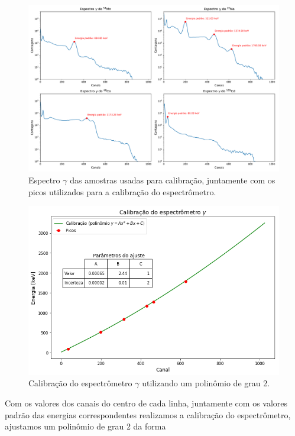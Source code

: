 \documentclass[a4paper, 11pt, notitlepage]{article}
\numberwithin{equation}{section}  %
\begin{document}
\begin{figure}[h]
    \centering
    \includegraphics[width=1.00\textwidth]{espectros_amostras_calibracao.pdf}
    \caption{Espectro $\gamma$ das amostras usadas para calibração, juntamente com os picos utilizados para a calibração do espectrômetro.}
    \label{fig:espectro.calibracao}
\end{figure}

\begin{figure}[H]
    \centering
    \includegraphics[width=1.00\textwidth]{ajuste_calibracao.png}
    \caption{Calibração do espectrômetro $\gamma$ utilizando um polinômio de grau 2.}
    \label{fig:calibracao}
\end{figure}

Com os valores dos canais do centro de cada linha, juntamente com os valores padrão das energias correspondentes realizamos a calibração do espectrômetro, ajustamos um polinômio de grau 2 da forma
\end{document}
